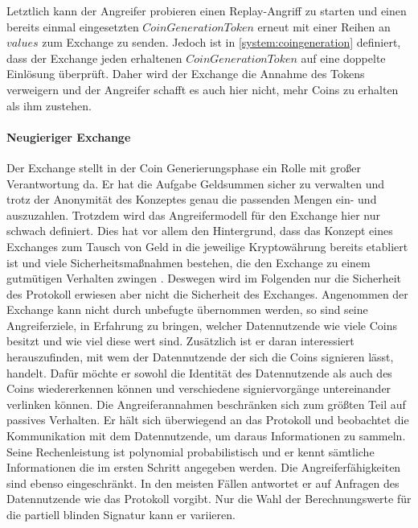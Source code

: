 \documentclass[11pt,a4paper]{scrreprt}
\begin{document}
Letztlich kann der Angreifer probieren einen Replay-Angriff zu starten und einen bereits einmal eingesetzten $CoinGenerationToken$ erneut mit einer Reihen an $values$ zum Exchange zu senden. Jedoch ist in \ref{system:coingeneration} definiert, dass der Exchange jeden erhaltenen $CoinGenerationToken$ auf eine doppelte Einlösung überprüft. Daher wird der Exchange die Annahme des Tokens verweigern und der Angreifer schafft es auch hier nicht, mehr Coins zu erhalten als ihm zustehen.\\

\paragraph{Neugieriger Exchange}
Der Exchange stellt in der Coin Generierungsphase ein Rolle mit großer Verantwortung da. Er hat die Aufgabe Geldsummen sicher zu verwalten und trotz der Anonymität des Konzeptes genau die passenden Mengen ein- und auszuzahlen. Trotzdem wird das Angreifermodell für den Exchange hier nur schwach definiert. Dies hat vor allem den Hintergrund, dass das Konzept eines Exchanges zum Tausch von Geld in die jeweilige Kryptowährung bereits etabliert ist und viele Sicherheitsmaßnahmen bestehen, die den Exchange zu einem gutmütigen Verhalten zwingen \cite{gnu-burdges2016enabling}\cite{kim2018risk}\cite{baum2021p2dex}. Deswegen wird im Folgenden nur die Sicherheit des Protokoll erwiesen aber nicht die Sicherheit des Exchanges.
Angenommen der Exchange kann nicht durch unbefugte übernommen werden, so sind seine Angreiferziele, in Erfahrung zu bringen, welcher Datennutzende wie viele Coins besitzt und wie viel diese wert sind.  Zusätzlich ist er daran interessiert herauszufinden, mit wem der Datennutzende der sich die Coins signieren lässt, handelt. Dafür möchte er sowohl die Identität des Datennutzende als auch des Coins wiedererkennen können und verschiedene signiervorgänge untereinander verlinken können. Die Angreiferannahmen beschränken sich zum größten Teil auf passives Verhalten. Er hält sich überwiegend an das Protokoll und beobachtet die Kommunikation mit dem Datennutzende, um daraus Informationen zu sammeln. Seine Rechenleistung ist polynomial probabilistisch und er kennt sämtliche Informationen die im ersten Schritt angegeben werden. Die Angreiferfähigkeiten sind ebenso eingeschränkt. In den meisten Fällen antwortet er auf Anfragen des Datennutzende wie das Protokoll vorgibt. Nur die Wahl der Berechnungswerte für die partiell blinden Signatur kann er variieren.\\
\end{document}
